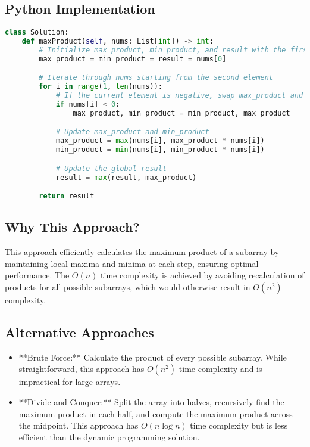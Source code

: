 \subsection*{Python Implementation}
\begin{fullwidth}
\begin{lstlisting}[language=Python]
class Solution:
    def maxProduct(self, nums: List[int]) -> int:
        # Initialize max_product, min_product, and result with the first element
        max_product = min_product = result = nums[0]

        # Iterate through nums starting from the second element
        for i in range(1, len(nums)):
            # If the current element is negative, swap max_product and min_product
            if nums[i] < 0:
                max_product, min_product = min_product, max_product

            # Update max_product and min_product
            max_product = max(nums[i], max_product * nums[i])
            min_product = min(nums[i], min_product * nums[i])

            # Update the global result
            result = max(result, max_product)

        return result
\end{lstlisting}
\end{fullwidth}

\subsection*{Why This Approach?}
This approach efficiently calculates the maximum product of a subarray by maintaining local maxima and minima at each step, ensuring optimal performance. The \(O(n)\) time complexity is achieved by avoiding recalculation of products for all possible subarrays, which would otherwise result in \(O(n^2)\) complexity.

\subsection*{Alternative Approaches}
\begin{itemize}
    \item **Brute Force:** Calculate the product of every possible subarray. While straightforward, this approach has \(O(n^2)\) time complexity and is impractical for large arrays.
    \item **Divide and Conquer:** Split the array into halves, recursively find the maximum product in each half, and compute the maximum product across the midpoint. This approach has \(O(n \log n)\) time complexity but is less efficient than the dynamic programming solution.
\end{itemize}

